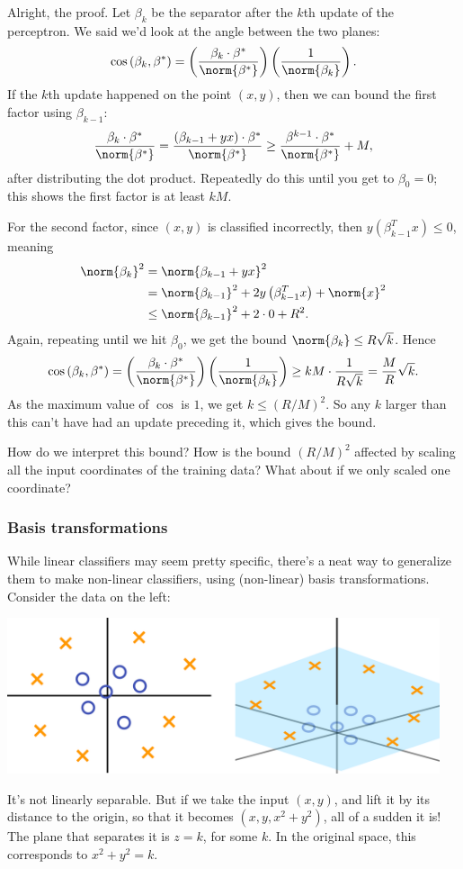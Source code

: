 \documentclass[11pt,paper=letter]{scrartcl}
\begin{document}
Alright, the proof. Let $\beta_k$ be the separator after the $k$th update of the perceptron. We said we'd look at the angle between the two planes:
\[
  \cos\left(\beta_k, \beta^*\right) = \left(\frac{\beta_k \cdot \beta^*}{\norm{\beta^*}}\right)\left(\frac{1}{\norm{\beta_k}}\right).
\]
If the $k$th update happened on the point $(x, y)$, then we can bound the first factor using $\beta_{k-1}$:
\[
  \frac{\beta_k \cdot \beta^*}{\norm{\beta^*}}
  = \frac{\left(\beta_{k-1} + yx\right) \cdot \beta^*}{\norm{\beta^*}} \ge \frac{\beta^{k-1} \cdot \beta^*}{\norm{\beta^*}} + M,
\]
after distributing the dot product. Repeatedly do this until you get to $\beta_0 = 0$; this shows the first factor is at least $kM$.

For the second factor, since $(x, y)$ is classified incorrectly, then $y(\beta_{k-1}^Tx) \le 0$, meaning
\begin{align*}
\norm{\beta_k}^2 &=
\norm{\beta_{k-1} + yx}^2 \\
&= \norm{\beta_{k-1}}^2 + 2y\left(\beta_{k-1}^Tx\right) + \norm{x}^2 \\
&\le \norm{\beta_{k-1}}^2 + 2 \cdot 0 + R^2.
\end{align*}
Again, repeating until we hit $\beta_0$, we get the bound $\norm{\beta_k} \le R\sqrt{k}$. Hence
\[
  \cos\left(\beta_k, \beta^*\right) = \left(\frac{\beta_k \cdot \beta^*}{\norm{\beta^*}}\right)\left(\frac{1}{\norm{\beta_k}}\right) \ge kM \cdot \frac{1}{R\sqrt{k}} = \frac{M}{R}\sqrt{k}.
\]
As the maximum value of $\cos$ is $1$, we get $k \le (R / M)^2$. So any $k$ larger than this can't have had an update preceding it, which gives the bound.
\begin{exrboxed}
  How do we interpret this bound? How is the bound $(R / M)^2$ affected by scaling all the input coordinates of the training data? What about if we only scaled one coordinate?
\end{exrboxed}

\subsubsection*{Basis transformations}

While linear classifiers may seem pretty specific, there's a neat way to generalize them to make non-linear classifiers, using (non-linear) basis transformations. Consider the data on the left:
\begin{center}
  \includegraphics[height=1.8in]{13.png}
\end{center}
It's not linearly separable. But if we take the input $(x, y)$, and lift it by its distance to the origin, so that it becomes $(x, y, x^2 + y^2)$, all of a sudden it is! The plane that separates it is $z = k$, for some $k$. In the original space, this corresponds to $x^2 + y^2 = k$.
\end{document}
